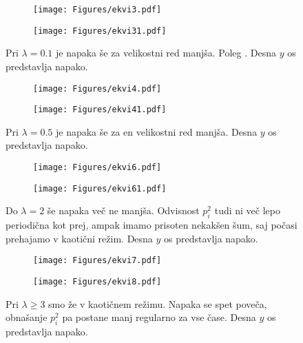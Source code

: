 \documentclass{article}
\begin{document}
\begin{figure}[H]
\centering
\begin{subfigure}{.49\textwidth}
\texttt{[image: Figures/ekvi3.pdf]}
\end{subfigure}
\begin{subfigure}{.49\textwidth}
\texttt{[image: Figures/ekvi31.pdf]}
\end{subfigure}
\caption*{Pri $\lambda=0.1$ je napaka še za velikostni red manjša. Poleg . Desna $y$ os predstavlja napako.}
\end{figure}

\begin{figure}[H]
\centering
\begin{subfigure}{.49\textwidth}
\texttt{[image: Figures/ekvi4.pdf]}
\end{subfigure}
\begin{subfigure}{.49\textwidth}
\texttt{[image: Figures/ekvi41.pdf]}
\end{subfigure}
\caption*{Pri $\lambda=0.5$ je napaka še za en velikostni red manjša. Desna $y$ os predstavlja napako.}
\end{figure}

\begin{figure}[H]
\centering
\begin{subfigure}{.49\textwidth}
\texttt{[image: Figures/ekvi6.pdf]}
\end{subfigure}
\begin{subfigure}{.49\textwidth}
\texttt{[image: Figures/ekvi61.pdf]}
\end{subfigure}
\caption*{Do $\lambda=2$ še napaka več ne manjša. Odvisnost $p_i^2$ tudi ni več lepo periodična kot prej, ampak imamo prisoten nekakšen šum, saj počasi prehajamo v kaotični režim.   Desna $y$ os predstavlja napako.}
\end{figure}

\begin{figure}[H]
\centering
\begin{subfigure}{.49\textwidth}
\texttt{[image: Figures/ekvi7.pdf]}
\end{subfigure}
\begin{subfigure}{.49\textwidth}
\texttt{[image: Figures/ekvi8.pdf]}
\end{subfigure}
\caption*{Pri $\lambda \geq 3$ smo že v kaotičnem režimu. Napaka se spet poveča, obnašanje $p_i^2$ pa postane manj regularno za vse čase.  Desna $y$ os predstavlja napako.}
\end{figure}
\end{document}
